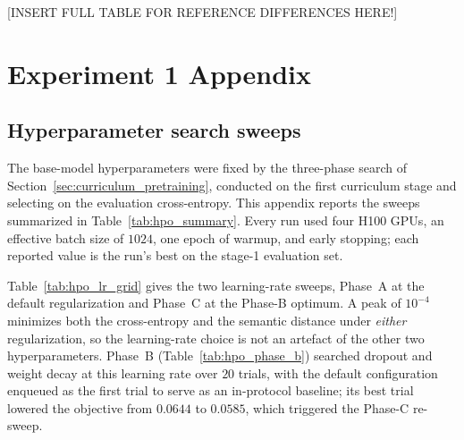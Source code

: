 \documentclass[titlepage,a4paper,11pt]{report}
\begin{document}
    [INSERT FULL TABLE FOR REFERENCE DIFFERENCES HERE!]

\section{Experiment 1 Appendix}
    \subsection{Hyperparameter search sweeps}\label{app:hpo}
    The base-model hyperparameters were fixed by the three-phase search of Section~\ref{sec:curriculum_pretraining}, conducted on the first curriculum stage and selecting on the evaluation cross-entropy. This appendix reports the sweeps summarized in Table~\ref{tab:hpo_summary}. Every run used four \textsc{H100} GPUs, an effective batch size of $1024$, one epoch of warmup, and early stopping; each reported value is the run's best on the stage-1 evaluation set.
    
    Table~\ref{tab:hpo_lr_grid} gives the two learning-rate sweeps, Phase~A at the default regularization and Phase~C at the Phase-B optimum. A peak of $10^{-4}$ minimizes both the cross-entropy and the semantic distance under \emph{either} regularization, so the learning-rate choice is not an artefact of the other two hyperparameters. Phase~B (Table~\ref{tab:hpo_phase_b}) searched dropout and weight decay at this learning rate over $20$ trials, with the default configuration enqueued as the first trial to serve as an in-protocol baseline; its best trial lowered the objective from $0.0644$ to $0.0585$, which triggered the Phase-C re-sweep.
\end{document}
